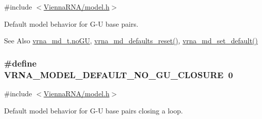 {\ttfamily \#include $<$\hyperlink{model_8h}{Vienna\-R\-N\-A/model.\-h}$>$}



Default model behavior for G-\/\-U base pairs. 

\begin{DoxySeeAlso}{See Also}
\hyperlink{group__model__details_ad64a5eaf9c4550e7525b36a725fec4b2}{vrna\-\_\-md\-\_\-t.\-no\-G\-U}, \hyperlink{group__model__details_ga70834424cf804d149937de89f80ceb45}{vrna\-\_\-md\-\_\-defaults\-\_\-reset()}, \hyperlink{group__model__details_ga8ac6ff84936282436f822644bf841f66}{vrna\-\_\-md\-\_\-set\-\_\-default()} 
\end{DoxySeeAlso}
\hypertarget{group__model__details_ga5308de46faaca4b9fd16045864901ee7}{
\subsubsection[{V\-R\-N\-A\-\_\-\-M\-O\-D\-E\-L\-\_\-\-D\-E\-F\-A\-U\-L\-T\-\_\-\-N\-O\-\_\-\-G\-U\-\_\-\-C\-L\-O\-S\-U\-R\-E}]{\setlength{\rightskip}{0pt plus 5cm}\#define V\-R\-N\-A\-\_\-\-M\-O\-D\-E\-L\-\_\-\-D\-E\-F\-A\-U\-L\-T\-\_\-\-N\-O\-\_\-\-G\-U\-\_\-\-C\-L\-O\-S\-U\-R\-E~0}}\label{group__model__details_ga5308de46faaca4b9fd16045864901ee7}


{\ttfamily \#include $<$\hyperlink{model_8h}{Vienna\-R\-N\-A/model.\-h}$>$}



Default model behavior for G-\/\-U base pairs closing a loop. 


